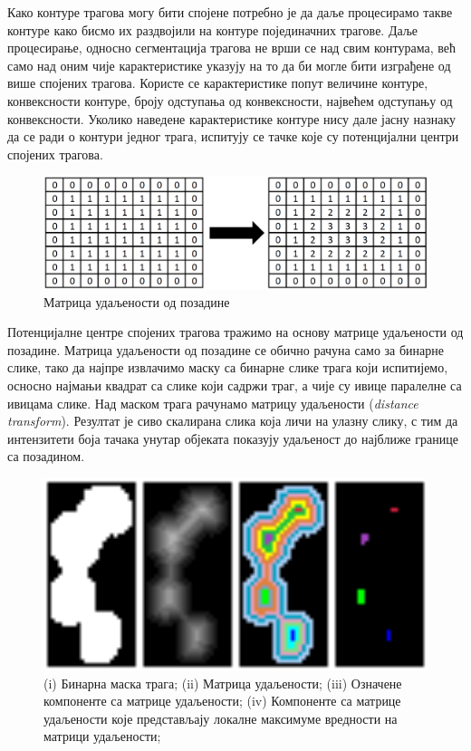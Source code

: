 \documentclass[12pt,a4paper,serbian,oneside]{book}
\begin{document}
Како контуре трагова могу бити спојене  потребно је да даље процесирамо такве контуре како бисмо их раздвојили на контуре појединачних трагове. Даље процесирање, односно сегментација трагова не врши се над свим контурама, већ само над оним чије карактеристике указују на то да би могле бити изграђене од више спојених трагова. Користе се карактеристике попут величине контуре, конвексности контуре, броју одступања од конвексности, највећем одступању од конвексности. Уколико наведене карактеристике контуре нису дале јасну назнаку да се ради о контури једног трага, испитују се тачке које су потенцијални центри спојених трагова.

\begin{figure}[htb]
\begin{center}
\includegraphics[width=120mm]{images/distance_matrix.png}
\end{center}
\caption{Матрица удаљености од позадине}
\label{fig:dist_matric}
\end{figure}

Потенцијалне центре спојених трагова тражимо на основу матрице удаљености од позадине. Матрица удаљености од позадине се обично рачуна само за бинарне слике, тако да  најпре извлачимо маску са бинарне слике трага који испитијемо, осносно најмањи квадрат са слике који садржи траг, а чије су ивице паралелне са ивицама слике. Над маском трага рачунамо матрицу удаљености (\textit{distance transform}). Резултат је сиво скалирана слика која личи на улазну слику, с тим да интензитети боја тачака унутар објеката показују удаљеност до најближе границе са позадином.

\begin{figure}[htb]
\begin{center}
\includegraphics[width=150mm]{images/local_maxima.png}
\end{center}
\caption{(i) Бинарна маска трага; (ii) Матрица удаљености; (iii) Означене компоненте са матрице удаљености; (iv) Компоненте са матрице удаљености које представљају локалне максимуме вредности на матрици удаљености; }
\label{fig:local_maxima}
\end{figure}
\end{document}
